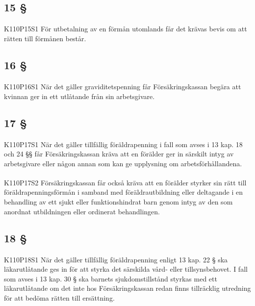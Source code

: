 \documentclass[a4paper,notitlepage,openany,10pt]{book}
\begin{document}
\subsection*{15 §}
\paragraph*{}
{\tiny K110P15S1}
För utbetalning av en förmån utomlands får det krävas bevis om att rätten till förmånen består.
\subsection*{16 §}
\paragraph*{}
{\tiny K110P16S1}
När det gäller graviditetspenning får Försäkringskassan begära att kvinnan ger in ett utlåtande från sin arbetsgivare.
\subsection*{17 §}
\paragraph*{}
{\tiny K110P17S1}
När det gäller tillfällig föräldrapenning i fall som avses i 13 kap. 18 och 24 §§ får Försäkringskassan kräva att en förälder ger in särskilt intyg av arbetsgivare eller någon annan som kan ge upplysning om arbetsförhållandena.
\paragraph*{}
{\tiny K110P17S2}
Försäkringskassan får också kräva att en förälder styrker sin rätt till föräldrapenningsförmån i samband med föräldrautbildning eller deltagande i en behandling av ett sjukt eller funktionshindrat barn genom intyg av den som anordnat utbildningen eller ordinerat behandlingen.
\subsection*{18 §}
\paragraph*{}
{\tiny K110P18S1}
När det gäller tillfällig föräldrapenning enligt 13 kap. 22 § ska läkarutlåtande ges in för att styrka det särskilda vård- eller tillsynsbehovet. I fall som avses i 13 kap. 30 § ska barnets sjukdomstillstånd styrkas med ett läkarutlåtande om det inte hos Försäkringskassan redan finns tillräcklig utredning för att bedöma rätten till ersättning.
\end{document}
